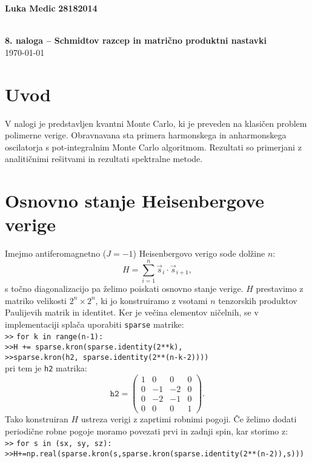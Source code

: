 \documentclass[paper=a4, fontsize=12pt]{scrartcl} %
\newcommand{\code}[1]{\texttt{#1}}
\begin{document}
\begin{flushright}
	\textbf{Luka Medic} \textbf{28182014}\\
\end{flushright}
\begin{center}
\vspace*{2cm}
\large{}\\[0.5cm]	%
\huge{\textbf{8. naloga -- Schmidtov razcep in matrično produktni nastavki}} \\[0.5cm]
\normalsize \normalfont \today\\[2cm]
\end{center}

\section{Uvod}
V nalogi je predstavljen kvantni Monte Carlo, ki je preveden na klasičen problem polimerne verige. Obravnavana sta primera harmonskega in anharmonskega oscilatorja s pot-integralnim Monte Carlo algoritmom. Rezultati so primerjani z analitičnimi rešitvami in rezultati spektralne metode.

\section{Osnovno stanje Heisenbergove verige}
Imejmo antiferomagnetno ($J=-1$) Heisenbergovo verigo sode dolžine $n$:
\begin{equation}
	H = \sum_{i=1}^n \vec{s}_i \cdot \vec{s}_{i+1},
\end{equation}
s točno diagonalizacijo pa želimo poiskati osnovno stanje verige.
$H$ prestavimo z matriko velikosti $2^n \times 2^n$, ki jo konstruiramo z vsotami $n$ tenzorskih produktov Paulijevih matrik in identitet. Ker je večina elementov ničelnih, se v implementaciji splača uporabiti \code{sparse} matrike:\\
\code{>>}  \code{for k in range(n-1):}\\
\code{>>}\qquad\code{H += sparse.kron(sparse.identity(2**k),}\\
\code{>>}\qquad\qquad\qquad\qquad\code{sparse.kron(h2, sparse.identity(2**(n-k-2))))}\\
pri tem je \code{h2} matrika:
\begin{equation}
	\code{h2} = \begin{pmatrix} 
      1 & 0 & 0 & 0 \\ 
      0 & -1 & -2 & 0 \\ 
      0 & -2 & -1 & 0 \\
      0 & 0 & 0 & 1 
   \end{pmatrix}.
\end{equation}
Tako konstruiran $H$ ustreza verigi z zaprtimi robnimi pogoji. Če želimo dodati periodične robne pogoje moramo povezati prvi in zadnji spin, kar storimo z:\\
\code{>>}  \code{for s in (sx, sy, sz):}\\
\code{>>}\qquad\code{H+=np.real(sparse.kron(s,sparse.kron(sparse.identity(2**(n-2)),s)))}\\
\end{document}
